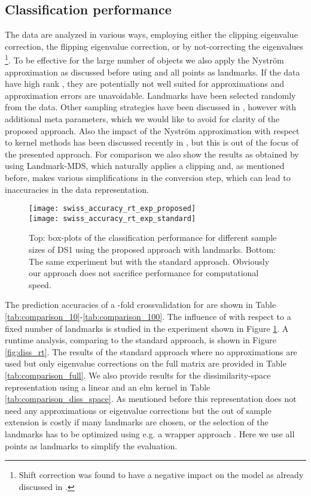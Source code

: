 \documentclass[twoside,11pt]{article}
\begin{document}
\subsection{Classification performance}
The data are analyzed in various ways, employing either the clipping eigenvalue correction, the flipping eigenvalue correction, or by not-correcting the eigenvalues
\footnote{
Shift correction was found to have a negative impact on the model as already discussed in \cite{DBLP:journals/jmlr/ChenGGRC09}.}. 
To be effective for the large number of objects we also apply the Nystr\"om approximation as discussed
before using  and all points as landmarks. If the data have high rank , they are potentially not well suited for approximations
and approximation errors are unavoidable.
Landmarks have been selected randomly from the data. Other sampling strategies have been discussed in \cite{DBLP:journals/jmlr/FarahatGK11,DBLP:journals/tnn/ZhangK10a,DBLP:conf/icml/SiHD14}, 
however with additional meta parameters, which we would like to avoid for clarity of the proposed approach. Also the impact of the Nystr\"om approximation with respect
to kernel methods has been discussed recently in \cite{DBLP:journals/jmlr/CortesMT10}, 
but this is out of the focus of the presented approach.
For comparison we also show the results as obtained by using Landmark-MDS, which naturally applies a clipping and, as mentioned before,
makes various simplifications in the conversion step, which can lead to inaccuracies in the data representation.
\begin{figure}[p]
	\centering
	\texttt{[image: swiss\_accuracy\_rt\_exp\_proposed]}\\\texttt{[image: swiss\_accuracy\_rt\_exp\_standard]}\caption{Top: box-plots of the classification performance for different sample sizes of DS1 using the proposed approach with  landmarks.
         Bottom: The same experiment but with the standard approach. Obviously our approach does not sacrifice performance for computational speed.}
         \label{fig:diss_rt_swiss}
\end{figure}
The prediction accuracies of a -fold crossvalidation for  are shown in Table \ref{tab:comparison_10}-\ref{tab:comparison_100}.
The influence of  with respect to a fixed number of landmarks is studied in the experiment shown in Figure \ref{fig:diss_rt_swiss}.
A runtime analysis, comparing to the standard approach, is shown in Figure \ref{fig:diss_rt}. The results of the standard approach where no approximations are used but only eigenvalue corrections on the full matrix 
are provided in Table \ref{tab:comparison_full}. We also provide results for the dissimilarity-space representation using a linear and an elm kernel \cite{DBLP:journals/ijon/FrenayV11} in Table \ref{tab:comparison_diss_space}.
As mentioned before this representation does not need any approximations or eigenvalue corrections but the out of sample extension is
costly if many landmarks are chosen, or the selection of the landmarks has to be optimized using e.g. a wrapper approach \cite{DBLP:journals/pr/PekalskaDP06}.
Here we use all points as landmarks to simplify the evaluation.
\end{document}
